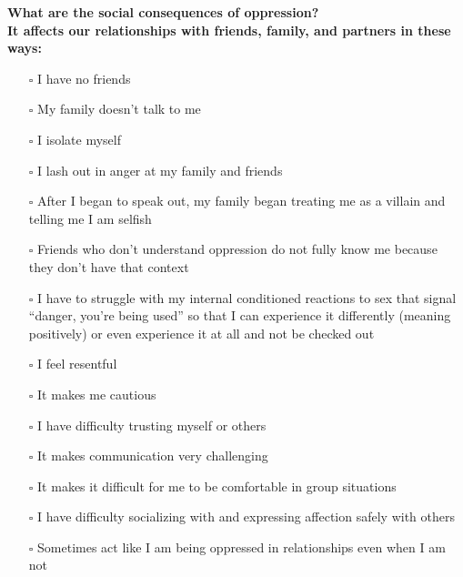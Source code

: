 \noindent\textcolor{ProcessBlue}{\textbf{\Large{What are the social consequences of oppression?}}}\\
\textbf{\large{It affects our relationships with friends, family, and partners in these ways:}}
\begin{multicols}{2}
\begin{itemize}
\item[$\square$]{I have no friends}
\item[$\square$]{My family doesn’t talk to me}
\item[$\square$]{I isolate myself}
\item[$\square$]{I lash out in anger at my family and friends}
\item[$\square$]{After I began to speak out, my family began treating me as a villain and telling me I am selfish}
\item[$\square$]{Friends who don’t understand oppression do not fully know me because they don’t have that context}
\item[$\square$]{I have to struggle with my internal conditioned reactions to sex that signal “danger, you’re being used” so that I can experience it differently (meaning positively) or even experience it at all and not be checked out}
\item[$\square$]{I feel resentful}
\item[$\square$]{It makes me cautious}
\item[$\square$]{I have difficulty trusting myself or others}
\item[$\square$]{It makes communication very challenging}
\item[$\square$]{It makes it difficult for me to be comfortable in group situations}
\item[$\square$]{I have difficulty socializing with and expressing affection safely with others}
\item[$\square$]{Sometimes act like I am being oppressed in relationships even when I am not}
\end{itemize}
\end{multicols}


